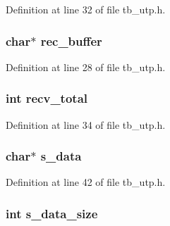 Definition at line 32 of file tb\-\_\-utp.\-h.

\hypertarget{structtb__utp__t_a2e6fac18f9532108c2aa44a52d3c6d67}{
\subsubsection[{rec\-\_\-buffer}]{\setlength{\rightskip}{0pt plus 5cm}char$\ast$ rec\-\_\-buffer}}\label{structtb__utp__t_a2e6fac18f9532108c2aa44a52d3c6d67}


Definition at line 28 of file tb\-\_\-utp.\-h.

\hypertarget{structtb__utp__t_abf192d5591e28d37f0795a6c730a9a5b}{
\subsubsection[{recv\-\_\-total}]{\setlength{\rightskip}{0pt plus 5cm}int recv\-\_\-total}}\label{structtb__utp__t_abf192d5591e28d37f0795a6c730a9a5b}


Definition at line 34 of file tb\-\_\-utp.\-h.

\hypertarget{structtb__utp__t_acf38f384acf7d5603daf8ddcd2a71a25}{
\subsubsection[{s\-\_\-data}]{\setlength{\rightskip}{0pt plus 5cm}char$\ast$ s\-\_\-data}}\label{structtb__utp__t_acf38f384acf7d5603daf8ddcd2a71a25}


Definition at line 42 of file tb\-\_\-utp.\-h.

\hypertarget{structtb__utp__t_a9572e5f95cdcd648c1973020b5f4a25b}{
\subsubsection[{s\-\_\-data\-\_\-size}]{\setlength{\rightskip}{0pt plus 5cm}int s\-\_\-data\-\_\-size}}\label{structtb__utp__t_a9572e5f95cdcd648c1973020b5f4a25b}


